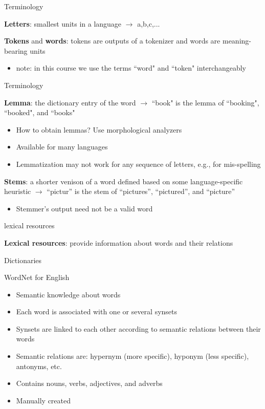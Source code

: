 \documentclass[12pt, handout]{beamer}
\begin{document}
\begin{frame}{Terminology}

\textbf{Letters}: smallest units in a language $\rightarrow$ a,b,c,...

\textbf{Tokens} and \textbf{words}: tokens are outputs of a tokenizer and words are meaning-bearing units

\begin{itemize}
	\item note: in this course we use the terms ``word" and ``token" interchangeably 
\end{itemize}

\end{frame}

\begin{frame}{Terminology}
	
\textbf{Lemma}: the dictionary entry of the word $\rightarrow$ ``book" is the lemma of ``booking", ``booked", and ``books"
\begin{itemize}
\item How to obtain lemmas? Use morphological analyzers 
\item Available for many languages
\item Lemmatization may not work for any sequence of letters, e.g., for mis-spelling
\end{itemize}
	
\textbf{Stems}: a shorter venison of a word defined based on some language-specific heuristic $\rightarrow$ ``pictur'' is the stem of ``pictures'', ``pictured'', and ``picture''
\begin{itemize}
	\item Stemmer's output need not be a valid word
\end{itemize}
	
\end{frame}

\begin{frame}{lexical resources}

\textbf{Lexical resources}: provide information about words and their relations


Dictionaries

WordNet for English
\begin{itemize}
	\item Semantic knowledge about words
	\item Each word is associated with one or several synsets
	\item Synsets are linked to each other according to semantic relations  between their words
	\item Semantic relations are: hypernym (more specific),  hyponym (less specific), antonyms, etc.
	\item Contains nouns, verbs, adjectives, and adverbs
	\item Manually created
\end{itemize}

\end{frame}
\end{document}
